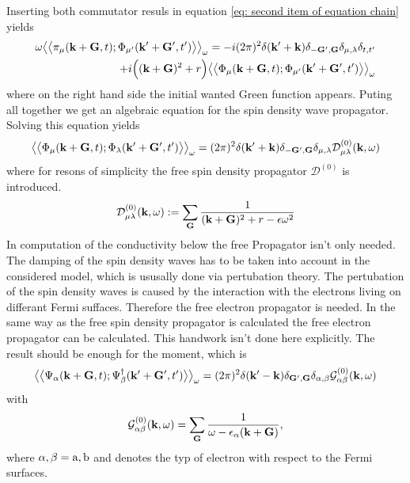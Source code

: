 %
Inserting both commutator resuls in equation \eqref{eq: second item of equation chain} yields
%
\begin{align}
	\omega \green{\pi_{\mu}(\vb{k}+\vb{G},t)}{\Phi_{\mu'}(\vb{k}'+\vb{G}',t')}_{\omega} = 
		-i (2\pi)^{2} \delta(\vb{k}'+\vb{k}) \delta_{-\vb{G}',\vb{G}} \delta_{\mu,\lambda} \delta_{t,t'} 
		\notag \\  \hspace{2cm} + 
		i\Big( (\vb{k}+\vb{G})^{2} + r \Big) \green{\Phi_{\mu}(\vb{k}+\vb{G},t)}{\Phi_{\mu'}(\vb{k}'+\vb{G}',t')}_{\omega}
\end{align}
%
where on the right hand side the initial wanted Green function appears.
Puting all together we get an algebraic equation for the spin density wave propagator.
Solving this equation yields
%
\begin{align}
	\green{\Phi_{\mu}(\vb{k}+\vb{G},t)}{\Phi_{\lambda}(\vb{k}'+\vb{G}',t')}_{\omega} = (2\pi)^{2} \delta(\vb{k}'+\vb{k}) \delta_{-\vb{G}',\vb{G}} \delta_{\mu,\lambda} \mathcal{D}_{\mu\lambda}^{(0)}(\vb{k},\omega)
\end{align}
%
where for resons of simplicity the free spin density propagator $\mathcal{D}^{(0)}$ is introduced.
%
\begin{align}
	\mathcal{D}_{\mu\lambda}^{(0)}(\vb{k},\omega) := \sum\limits_{\vb{G}} \frac{1}{(\vb{k}+\vb{G})^{2} + r - \epsilon \omega^{2}}
\end{align}
%
In computation of the conductivity below the free Propagator isn't only needed.
The damping of the spin density waves has to be taken into account in the considered model, which is ususally done via pertubation theory.
The pertubation of the spin density waves is caused by the interaction with the electrons living on differant Fermi suffaces.
Therefore the free electron propagator is needed.
In the same way as the free spin density propagator is calculated the free electron propagator can be calculated.
This handwork isn't done here explicitly.
The result should be enough for the moment, which is
%
\begin{align}
	 \green{\Psi_{\alpha}(\vb{k}+\vb{G},t)}{\Psi_{\beta}^{\dag}(\vb{k}'+\vb{G}',t')}_{\omega} = (2\pi)^{2} \delta(\vb{k}'-\vb{k}) \delta_{\vb{G}',\vb{G}} \delta_{\alpha,\beta} \mathcal{G}_{\alpha\beta}^{(0)}(\vb{k},\omega)
\end{align}
%
with
%
\begin{align}
	\mathcal{G}_{\alpha\beta}^{(0)}(\vb{k},\omega) = \sum\limits_{\vb{G}} \frac{1}{\omega - \epsilon_{\alpha}(\vb{k}+\vb{G})},
\end{align}
%
where $\alpha, \beta = \mathrm{a,b}$ and denotes the typ of electron with respect to the Fermi surfaces.
%
%
